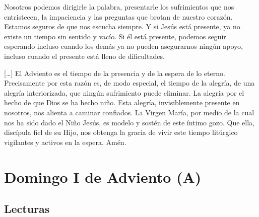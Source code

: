 \documentclass[]{article}
\begin{document}
Nosotros podemos dirigirle la palabra, presentarle los sufrimientos que
nos entristecen, la impaciencia y las preguntas que brotan de nuestro
corazón. Estamos seguros de que nos escucha siempre. Y si Jesús está
presente, ya no existe un tiempo sin sentido y vacío. Si él está
presente, podemos seguir esperando incluso cuando los demás ya no pueden
asegurarnos ningún apoyo, incluso cuando el presente está lleno de
dificultades.

{[}\ldots{}{]} El Adviento es el tiempo de la presencia y de la espera
de lo eterno. Precisamente por esta razón es, de modo especial, el
tiempo de la alegría, de una alegría interiorizada, que ningún
sufrimiento puede eliminar. La alegría por el hecho de que Dios se ha
hecho niño. Esta alegría, invisiblemente presente en nosotros, nos
alienta a caminar confiados. La Virgen María, por medio de la cual nos
ha sido dado el Niño Jesús, es modelo y sostén de este íntimo gozo. Que
ella, discípula fiel de su Hijo, nos obtenga la gracia de vivir este
tiempo litúrgico vigilantes y activos en la espera. Amén.

\chapter{Domingo I de Adviento (A)}\label{domingo-i-de-adviento-a}

\section{Lecturas}\label{lecturas}


 

\end{document}
